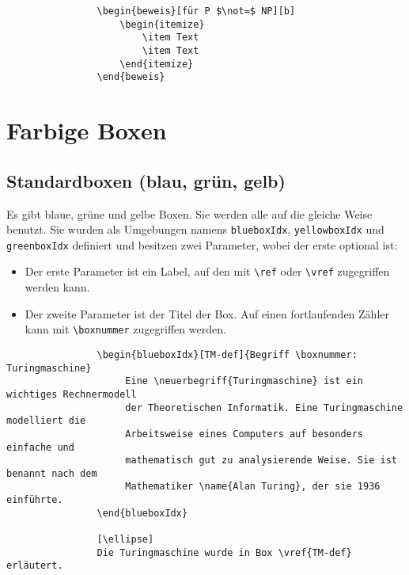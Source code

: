 			\begin{verbatim}
				\begin{beweis}[für P $\not=$ NP][b]
				    \begin{itemize}
				        \item Text
				        \item Text
				    \end{itemize}
				\end{beweis}
			\end{verbatim}


	\chapter{Farbige Boxen}
		\section{Standardboxen (blau, grün, gelb)}
			Es gibt blaue, grüne und gelbe Boxen. Sie werden alle auf die gleiche Weise benutzt. Sie wurden als Umgebungen namens \verb|blueboxIdx|, \verb|yellowboxIdx| und \verb|greenboxIdx| definiert und besitzen zwei Parameter, wobei der erste optional ist:
			\begin{itemize}
				\item Der erste Parameter ist ein Label, auf den mit \verb|\ref| oder \verb|\vref| zugegriffen werden kann.
				\item Der zweite Parameter ist der Titel der Box. Auf einen fortlaufenden Zähler kann mit \verb|\boxnummer| zugegriffen werden.
			\end{itemize}
			
			\begin{verbatim}
				\begin{blueboxIdx}[TM-def]{Begriff \boxnummer: Turingmaschine}
				     Eine \neuerbegriff{Turingmaschine} ist ein wichtiges Rechnermodell
				     der Theoretischen Informatik. Eine Turingmaschine modelliert die
				     Arbeitsweise eines Computers auf besonders einfache und
				     mathematisch gut zu analysierende Weise. Sie ist benannt nach dem
				     Mathematiker \name{Alan Turing}, der sie 1936 einführte.
				\end{blueboxIdx}

				[\ellipse]
				Die Turingmaschine wurde in Box \vref{TM-def} erläutert.
			\end{verbatim}
			
